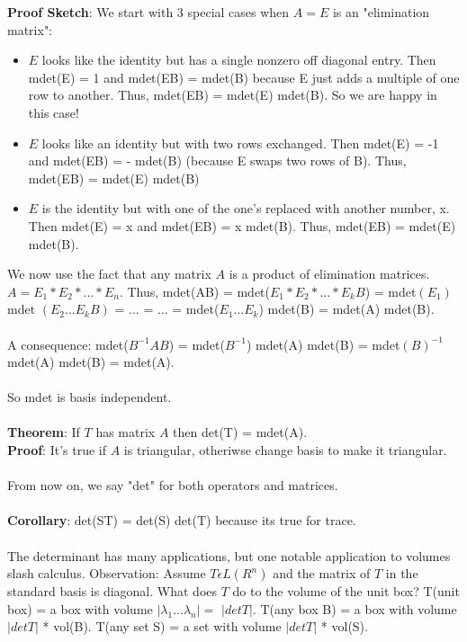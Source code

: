 \documentclass{article}
\begin{document}
\textbf{Proof Sketch}: We start with 3 special cases when $A = E$ is an "elimination matrix": 
\begin{itemize}
    \item $E$ looks like the identity but has a single nonzero off diagonal entry. Then mdet(E) = 1 and mdet(EB) = mdet(B) because E just adds a multiple of one row to another. Thus, mdet(EB) = mdet(E) mdet(B). So we are happy in this case! 
    \item $E$ looks like an identity but with two rows exchanged. Then mdet(E) = -1 and mdet(EB) = - mdet(B) (because E swaps two rows of B). Thus, mdet(EB) = mdet(E) mdet(B)
    \item $E$ is the identity but with one of the one's replaced with another number, x. Then mdet(E) = x and mdet(EB) = x mdet(B). Thus, mdet(EB) = mdet(E) mdet(B). 
\end{itemize}
We now use the fact that any matrix $A$ is a product of elimination matrices. $A = E_1 * E_2 * ... * E_n$. Thus, mdet(AB) = mdet($E_1 * E_2 * ... * E_kB$) = mdet$(E_1)$ mdet $(E_2 ... E_k B)$ = ... = ... = mdet($E_1 ... E_k$) mdet(B) = mdet(A) mdet(B). \\\\
A consequence: mdet($B^{-1}AB$) = mdet($B^{-1}$) mdet(A) mdet(B) = mdet$(B)^ {-1}$ mdet(A) mdet(B) = mdet(A). \\\\
So mdet is basis independent. \\\\
\textbf{Theorem}: If $T$ has matrix $A$ then det(T) = mdet(A). \\
\textbf{Proof}: It's true if $A$ is triangular, otheriwse change basis to make it triangular. \\\\
From now on, we say "det" for both operators and matrices. \\\\
\textbf{Corollary}: det(ST) = det(S) det(T) because its true for trace. \\\\
The determinant has many applications, but one notable application to volumes slash calculus. Observation: Assume $T \epsilon L(R^n)$ and the matrix  of $T$ in the standard basis is diagonal. What does $T$ do to the volume of the unit box? T(unit box) = a box with volume $|\lambda_1 ... \lambda_n| =$ $|det T|$. T(any box B) = a box with volume $|det T|$ * vol(B). T(any set S) = a set with volume $|det T|$ * vol(S). \\\\
\end{document}
